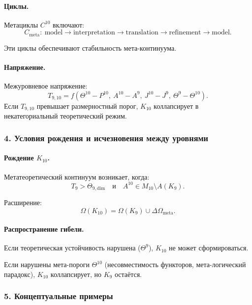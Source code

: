 \paragraph{Циклы.}
Метациклы $C^{10}$ включают:
\[
C_{\mathrm{meta}}:\
\text{model} \rightarrow \text{interpretation} \rightarrow \text{translation}
\rightarrow \text{refinement} \rightarrow \text{model}.
\]

Эти циклы обеспечивают стабильность мета-континуума.

\paragraph{Напряжение.}
Межуровневое напряжение:
\[
T_{9,10} =
f(\Theta^{10} - P^{10},\ A^{10} - A^9,\
  J^{10} - J^9,\ \Theta^9 - \Theta^{10}).
\]
Если $T_{9,10}$ превышает размерностный порог, $K_{10}$ коллапсирует в
некатегориальный теоретический режим.

\subsubsection{4. Условия рождения и исчезновения между уровнями}

\paragraph{Рождение $K_{10}$.}
Метатеоретический континуум возникает, когда:
\[
T_9 > \Theta_{9,\mathrm{dim}}
\quad\text{и}\quad
A^{10} \in M_{10} \setminus A(K_9).
\]

Расширение:
\[
\Omega(K_{10}) = \Omega(K_9) \cup \Delta\Omega_{\mathrm{meta}}.
\]

\paragraph{Распространение гибели.}
Если теоретическая устойчивость нарушена ($\Theta^9$), $K_{10}$ не может сформироваться.

Если нарушены мета-пороги $\Theta^{10}$ (несовместимость функторов,
мета-логический парадокс), $K_{10}$ коллапсирует, но $K_9$ остаётся.

\subsubsection{5. Концептуальные примеры}


